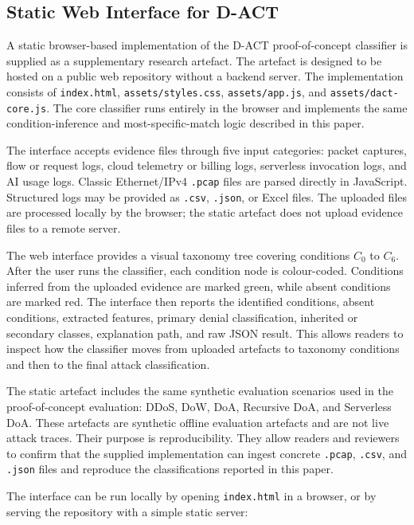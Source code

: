 \subsection{Static Web Interface for D-ACT}
\label{app:dact_static_web_interface}

A static browser-based implementation of the D-ACT proof-of-concept classifier is supplied as a supplementary research artefact. The artefact is designed to be hosted on a public web repository without a backend server. The implementation consists of \texttt{index.html}, \texttt{assets/styles.css}, \texttt{assets/app.js}, and \texttt{assets/dact-core.js}. The core classifier runs entirely in the browser and implements the same condition-inference and most-specific-match logic described in this paper.

The interface accepts evidence files through five input categories: packet captures, flow or request logs, cloud telemetry or billing logs, serverless invocation logs, and AI usage logs. Classic Ethernet/IPv4 \texttt{.pcap} files are parsed directly in JavaScript. Structured logs may be provided as \texttt{.csv}, \texttt{.json}, or Excel files. The uploaded files are processed locally by the browser; the static artefact does not upload evidence files to a remote server.

The web interface provides a visual taxonomy tree covering conditions \(C_0\) to \(C_6\). After the user runs the classifier, each condition node is colour-coded. Conditions inferred from the uploaded evidence are marked green, while absent conditions are marked red. The interface then reports the identified conditions, absent conditions, extracted features, primary denial classification, inherited or secondary classes, explanation path, and raw JSON result. This allows readers to inspect how the classifier moves from uploaded artefacts to taxonomy conditions and then to the final attack classification.

The static artefact includes the same synthetic evaluation scenarios used in the proof-of-concept evaluation: DDoS, DoW, DoA, Recursive DoA, and Serverless DoA. These artefacts are synthetic offline evaluation artefacts and are not live attack traces. Their purpose is reproducibility. They allow readers and reviewers to confirm that the supplied implementation can ingest concrete \texttt{.pcap}, \texttt{.csv}, and \texttt{.json} files and reproduce the classifications reported in this paper.

The interface can be run locally by opening \texttt{index.html} in a browser, or by serving the repository with a simple static server:

